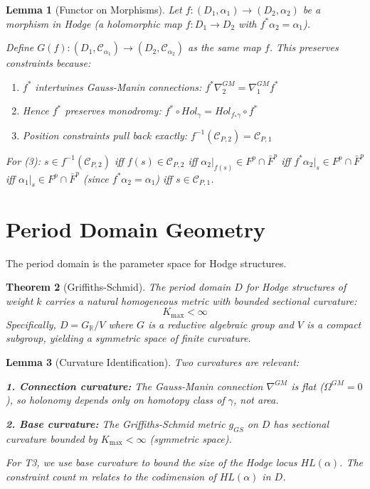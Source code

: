 \documentclass[12pt]{article}
\newtheorem{theorem}{Theorem}
\newtheorem{lemma}[theorem]{Lemma}
\begin{document}
\begin{lemma}[Functor on Morphisms]
Let $f: (D_1, \alpha_1) \to (D_2, \alpha_2)$ be a morphism in Hodge 
(a holomorphic map $f: D_1 \to D_2$ with $f^*\alpha_2 = \alpha_1$).

Define $G(f): (D_1, \mathcal{C}_{\alpha_1}) \to (D_2, \mathcal{C}_{\alpha_2})$ 
as the same map $f$. This preserves constraints because:
\begin{enumerate}
\item $f^*$ intertwines Gauss-Manin connections: $f^* \nabla^{GM}_2 = \nabla^{GM}_1 f^*$
\item Hence $f^*$ preserves monodromy: $f^* \circ Hol_{\gamma} = Hol_{f_*\gamma} \circ f^*$
\item Position constraints pull back exactly: $f^{-1}(\mathcal{C}_{P,2}) = \mathcal{C}_{P,1}$
\end{enumerate}
For (3): $s \in f^{-1}(\mathcal{C}_{P,2})$ iff $f(s) \in \mathcal{C}_{P,2}$ iff 
$\alpha_2|_{f(s)} \in F^p \cap \bar{F}^p$ iff $f^*\alpha_2|_s \in F^p \cap \bar{F}^p$ 
iff $\alpha_1|_s \in F^p \cap \bar{F}^p$ (since $f^*\alpha_2 = \alpha_1$) iff $s \in \mathcal{C}_{P,1}$.
\end{lemma}

\section{Period Domain Geometry}

The period domain is the parameter space for Hodge structures.

\begin{theorem}[Griffiths-Schmid]
The period domain $D$ for Hodge structures of weight $k$ carries a natural
homogeneous metric with bounded sectional curvature:
\[
K_{\max} < \infty
\]
Specifically, $D = G_\mathbb{R}/V$ where $G$ is a reductive algebraic group
and $V$ is a compact subgroup, yielding a symmetric space of finite curvature.
\end{theorem}

\begin{lemma}[Curvature Identification]
Two curvatures are relevant:

\textbf{1. Connection curvature:} The Gauss-Manin connection $\nabla^{GM}$ is flat 
($\Omega^{GM} = 0$), so holonomy depends only on homotopy class of $\gamma$, not area.

\textbf{2. Base curvature:} The Griffiths-Schmid metric $g_{GS}$ on $D$ has 
sectional curvature bounded by $K_{\max} < \infty$ (symmetric space).

For T3, we use base curvature to bound the \emph{size} of the Hodge locus $HL(\alpha)$.
The constraint count $m$ relates to the codimension of $HL(\alpha)$ in $D$.
\end{lemma}
\end{document}
